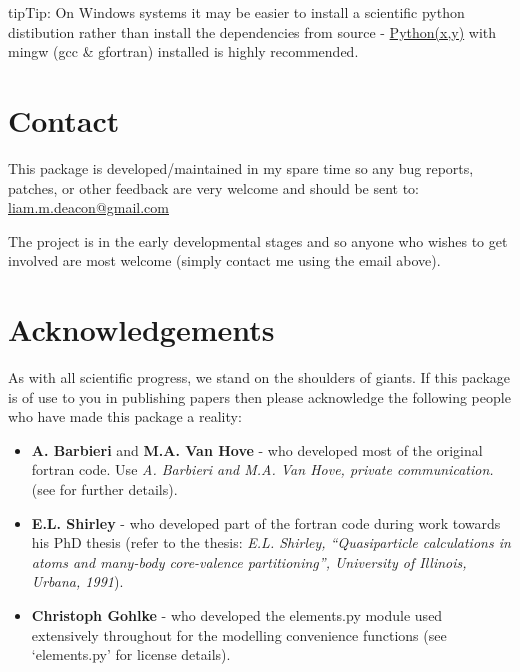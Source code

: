\documentclass[letterpaper,10pt,english]{sphinxmanual}
\begin{document}
\begin{notice}{tip}{Tip:}
On Windows systems it may be easier to install a scientific python distibution
rather than install the dependencies from source - \href{http://code.google.com/p/pythonxy}{Python(x,y)} with mingw (gcc \& gfortran)
installed is highly recommended.
\end{notice}


\chapter{Contact}
\label{contact:contact}\label{contact::doc}\label{contact:id1}
This package is developed/maintained in my spare time so any bug reports, patches,
or other feedback are very welcome and should be sent to: \href{mailto:liam.m.deacon@gmail.com}{liam.m.deacon@gmail.com}

The project is in the early developmental stages and so anyone who wishes to get
involved are most welcome (simply contact me using the email above).


\chapter{Acknowledgements}
\label{acknowledgements:acknowledgements}\label{acknowledgements::doc}\label{acknowledgements:id1}
As with all scientific progress, we stand on the shoulders of giants. If this
package is of use to you in publishing papers then please acknowledge the
following people who have made this package a reality:
\begin{itemize}
\item {} 
\textbf{A. Barbieri} and \textbf{M.A. Van Hove} - who developed most of the original
fortran code. Use \emph{A. Barbieri and M.A. Van Hove, private communication.}
(see  for further details).

\item {} 
\textbf{E.L. Shirley} - who developed part of the fortran code during work towards his
PhD thesis (refer to the thesis: \emph{E.L. Shirley, ``Quasiparticle calculations in
atoms and many-body core-valence partitioning'', University of Illinois, Urbana, 1991}).

\item {} 
\textbf{Christoph Gohlke} - who developed the elements.py module used extensively throughout
for the modelling convenience functions (see `elements.py' for license details).

\end{itemize}
\end{document}
